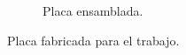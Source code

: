 \begin{figure}[H]
\begin{subfigure}{\textwidth}
         \caption{Placa ensamblada.}
         \label{fig:placa3}
     \end{subfigure}
        \caption{Placa fabricada para el trabajo.}
        \label{fig:three graphs}
\end{figure}